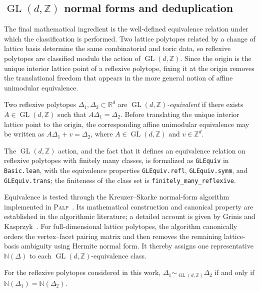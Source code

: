 \documentclass[appliedmath,article,submit,moreauthors]{Definitions/mdpi}
\newcommand{\Z}{\mathbb{Z}}
\newcommand{\GL}{\operatorname{GL}}
\newcommand{\RR}{\mathbb{R}}
\newcommand{\NF}{\mathbb{N}}
\newcommand{\PALP}{\textsc{Palp}}
\begin{document}
\subsection{\texorpdfstring{\(\GL(d,\Z)\)}{GL(d,Z)} normal forms and deduplication}
\label{sec:math-nf}

{\color{blue}The final mathematical ingredient is the well-defined equivalence
relation under which the classification is performed.} Two lattice polytopes related by a
change of lattice basis determine the same combinatorial and toric data, so
reflexive polytopes are classified modulo the action of \(\GL(d,\Z)\). Since the
origin is the unique interior lattice point of a reflexive polytope, fixing it
at the origin removes the translational freedom that appears in the more general
notion of affine unimodular equivalence.

\begin{Definition}[\(\GL(d,\Z)\)-equivalence]
\label{def:gl-equivalence}
Two reflexive polytopes \(\Delta_1,\Delta_2\subset\RR^d\) are
\emph{\(\GL(d,\Z)\)-equivalent} if there exists \(A\in\GL(d,\Z)\) such that
\(A\Delta_1=\Delta_2\). Before translating the unique interior lattice point to
the origin, the corresponding affine unimodular equivalence may be written as
\(A\Delta_1+v=\Delta_2\), where \(A\in\GL(d,\Z)\) and \(v\in\Z^d\).
\end{Definition}

The \(\GL(d,\Z)\) action, and the fact that it defines an equivalence relation
on reflexive polytopes with finitely many classes, is formalized as
\nolinkurl{GLEquiv} in \nolinkurl{Basic.lean}, with the equivalence properties
\nolinkurl{GLEquiv.refl}, \nolinkurl{GLEquiv.symm}, and
\nolinkurl{GLEquiv.trans}; the finiteness of the class set is
\nolinkurl{finitely\_many\_reflexive}.

{\color{blue}
Equivalence is tested through the Kreuzer--Skarke normal-form algorithm
implemented in \PALP~\cite{PALP}. Its mathematical construction and canonical
property are established in the algorithmic literature; a detailed account is
given by Grinis and Kasprzyk~\cite{GrinisKasprzyk2013}. For full-dimensional
lattice polytopes, the algorithm canonically orders the vertex--facet pairing
matrix and then removes the remaining lattice-basis ambiguity using Hermite
normal form. It thereby assigns one representative \(\NF(\Delta)\) to each
\(\GL(d,\Z)\)-equivalence class.
}

\begin{Proposition}[\textcolor{blue}{Kreuzer--Skarke normal-form criterion
(external result)}]
\label{prop:nf}
{\color{blue}
For the reflexive polytopes considered in this work,
\(\Delta_1\sim_{\GL(d,\Z)}\Delta_2\) if and only if
\(\NF(\Delta_1)=\NF(\Delta_2)\).
}
\end{Proposition}
\end{document}
